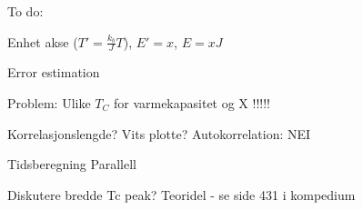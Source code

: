 To do:

Enhet akse ($ T' = \frac{k_b}{J} T $), $ E'  = x$, $ E = xJ $

Error estimation

Problem: 
	Ulike $T_C$ for varmekapasitet og X !!!!!
	
Korrelasjonslengde? Vits plotte?
	Autokorrelation: NEI
	
Tidsberegning
Parallell

Diskutere bredde Tc peak? Teoridel - se side 431 i kompedium
